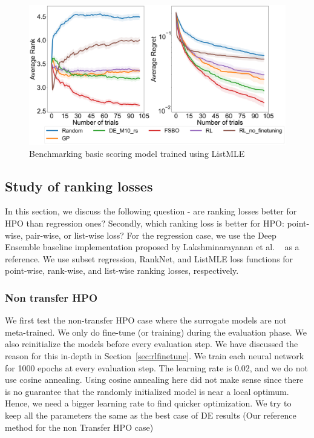 \documentclass[12pt, twoside, ngerman]{report}
\begin{document}
\begin{figure}[h]
  \centering
    \includegraphics[scale=0.25]{images/RLEvaluationBasicScoring}
    \caption{Benchmarking basic scoring model trained using ListMLE}
    \label{fig:RLEvaluationBasicScoring}
\end{figure}
\fi

\subsection{Study of ranking losses}

In this section, we discuss the following question - are ranking losses better for HPO than regression ones? Secondly, which ranking loss is better for HPO: point-wise,  pair-wise, or list-wise loss?
For the regression case,  we use the Deep Ensemble baseline implementation proposed by Lakshminarayanan et al. ~\cite{DeepEnsemblePaper} as a reference. We use subset regression,  RankNet, and ListMLE loss functions for point-wise, rank-wise, and list-wise ranking losses, respectively. 

\subsubsection{Non transfer HPO}
We first test the non-transfer HPO case where the surrogate models are not meta-trained. We only do fine-tune (or training) during the evaluation phase. We also reinitialize the models before every evaluation step. We have discussed the reason for this in-depth in Section~\ref{sec:rlfinetune}.
We train each neural network for 1000 epochs at every evaluation step. The learning rate is 0.02, and we do not use cosine annealing.
Using cosine annealing here did not make sense since there is no guarantee that the randomly initialized model is near a local optimum.
Hence, we need a bigger learning rate to find quicker optimization.
We try to keep all the parameters the same as the best case of DE results (Our reference method for the non Transfer HPO case)
\end{document}
